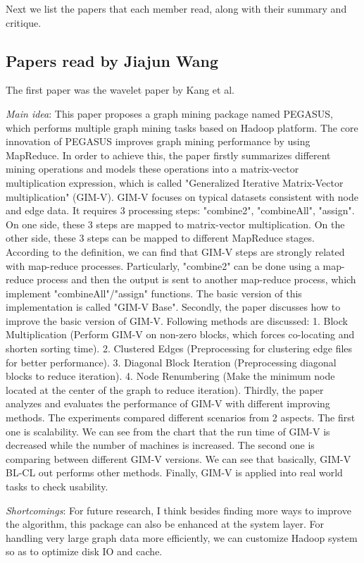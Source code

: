 Next we list the papers that each member read,
along with their summary and critique.

\subsection{Papers read by Jiajun Wang}
The first paper was the wavelet paper by Kang et al.
\cite{Daubechies92Ten}
\begin{itemize*}
\item {\em Main idea}: This paper proposes a graph mining package named PEGASUS, which performs multiple graph mining tasks based on Hadoop platform. The core innovation of PEGASUS improves graph mining performance by using MapReduce.
In order to achieve this, the paper firstly summarizes different mining operations and models these operations into a matrix-vector multiplication expression, which is called "Generalized Iterative Matrix-Vector multiplication" (GIM-V). GIM-V focuses on typical datasets consistent with node and edge data. It requires 3 processing steps: "combine2", "combineAll", "assign". On one side, these 3 steps are mapped to matrix-vector multiplication. On the other side, these 3 steps can be mapped to different MapReduce stages. According to the definition, we can find that GIM-V steps are strongly related with map-reduce processes. Particularly, "combine2" can be done using a map-reduce process and then the output is sent to another map-reduce process, which implement "combineAll"/"assign" functions. The basic version of this implementation is called "GIM-V Base".
Secondly, the paper discusses how to improve the basic version of GIM-V. Following methods are discussed: 1. Block Multiplication (Perform GIM-V on non-zero blocks, which forces co-locating and shorten sorting time). 2. Clustered Edges (Preprocessing for clustering edge files for better performance). 3. Diagonal Block Iteration (Preprocessing diagonal blocks to reduce iteration). 4. Node Renumbering (Make the minimum node located at the center of the graph to reduce iteration).
Thirdly, the paper analyzes and evaluates the performance of GIM-V with different improving methods. The experiments compared different scenarios from 2 aspects. The first one is scalability. We can see from the chart that the run time of GIM-V is decreased while the number of machines is increased. The second one is comparing between different GIM-V versions. We can see that basically, GIM-V BL-CL out performs other methods.
Finally, GIM-V is applied into real world tasks to check usability.
\item {\em Shortcomings}:
	For future research, I think besides finding more ways to improve the algorithm, this package can also be enhanced at the system layer. For handling very large graph data more efficiently, we can customize Hadoop system so as to optimize disk IO and cache.
\end{itemize*}


